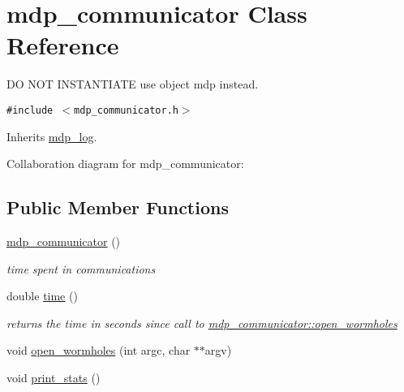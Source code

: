 \hypertarget{classmdp__communicator}{
\section{mdp\_\-communicator Class Reference}
\label{classmdp__communicator}
}
DO NOT INSTANTIATE use object mdp instead.  


{\tt \#include $<$mdp\_\-communicator.h$>$}

Inherits \hyperlink{classmdp__log}{mdp\_\-log}.

Collaboration diagram for mdp\_\-communicator:\subsection*{Public Member Functions}
\begin{CompactItemize}
\item 
\hypertarget{classmdp__communicator_9c38d613d17973364b3121d8e8b03301}{
\hyperlink{classmdp__communicator_9c38d613d17973364b3121d8e8b03301}{mdp\_\-communicator} ()}
\label{classmdp__communicator_9c38d613d17973364b3121d8e8b03301}

\begin{CompactList}\small\item\em time spent in communications \item\end{CompactList}\item 
\hypertarget{classmdp__communicator_7e725836b00c3485cd02b3ad001cf6dd}{
double \hyperlink{classmdp__communicator_7e725836b00c3485cd02b3ad001cf6dd}{time} ()}
\label{classmdp__communicator_7e725836b00c3485cd02b3ad001cf6dd}

\begin{CompactList}\small\item\em returns the time in seconds since call to \hyperlink{classmdp__communicator_f2c43869a689b8f1d020d4c4995b0cee}{mdp\_\-communicator::open\_\-wormholes} \item\end{CompactList}\item 
void \hyperlink{classmdp__communicator_f2c43869a689b8f1d020d4c4995b0cee}{open\_\-wormholes} (int argc, char $\ast$$\ast$argv)
\item 
\hypertarget{classmdp__communicator_33ee55b0c67b1f63fd3a100e36fcc35e}{
void \hyperlink{classmdp__communicator_33ee55b0c67b1f63fd3a100e36fcc35e}{print\_\-stats} ()}
\label{classmdp__communicator_33ee55b0c67b1f63fd3a100e36fcc35e}


\end{CompactItemize}
